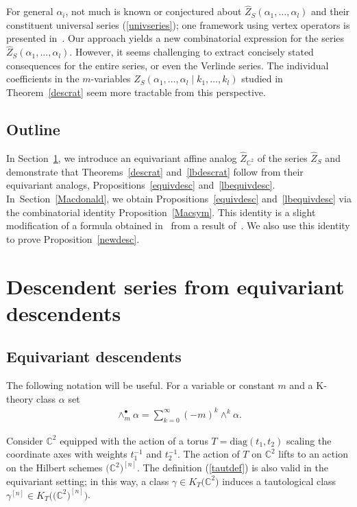 \documentclass[10pt,a4paper]{amsart}
\numberwithin{equation}{section}
\def\C{\mathbb C}
\begin{document}
For general $\alpha_i$, not much is known or conjectured about $\hat{Z}_S(\alpha_1,\dots,\alpha_l)$ and their constituent universal series (\ref{univseries}); one framework using vertex operators is presented in~\cite{Z}. Our approach yields a new combinatorial expression for the series $\hat{Z}_S(\alpha_1,\dots,\alpha_l)$. However, it seems challenging to extract concisely stated consequences for the entire series, or even the Verlinde series. The individual coefficients in the $m$-variables $Z_S(\alpha_1,\dots,\alpha_l\mid k_1,\dots, k_l)$ studied in Theorem~\ref{descrat} seem more tractable from this perspective.


\subsection{Outline} In Section~\ref{C2togen}, we introduce an equivariant affine analog $\hat{Z}_{\C^2}$ of the series $\hat{Z}_S$ and demonstrate that Theorems~\ref{descrat} and~\ref{lbdescrat} follow from their equivariant analogs, Propositions~\ref{equivdesc} and~\ref{lbequivdesc}. In~Section~\ref{Macdonald}, we obtain Propositions~\ref{equivdesc} and~\ref{lbequivdesc} via the combinatorial identity Proposition~\ref{Macsym}. This identity is a slight modification of a formula obtained in~\cite{M} from a result of~\cite{GHT}. We also use this identity to prove Proposition~\ref{newdesc}.



\section{Descendent series from equivariant descendents}\label{C2togen}

\subsection{Equivariant descendents}
The following notation will be useful. For a variable or constant $m$ and a K-theory class $\alpha$ set \begin{gather*}
\wedge_{m}^{\bullet}\alpha=\sum_{k=0}^{\infty} (-m)^k \wedge^k \alpha.
\end{gather*}

Consider $\C^2$ equipped with the action of a torus $T=\mathrm{diag}(t_1,t_2)$ scaling the coordinate axes with weights $t_1^{-1}$ and $t_2^{-1}$. The action of $T$ on $\C^2$ lifts to an action on the Hilbert schemes $\big(\C^2\big)^{[n]}.$ The definition (\ref{tautdef}) is also valid in the equivariant setting; in this way, a class $\gamma\in K_T\big(\C^2\big)$ induces a tautological class $\gamma^{[n]} \in K_T\big(\big(\C^2\big)^{[n]}\big)$.
\end{document}
